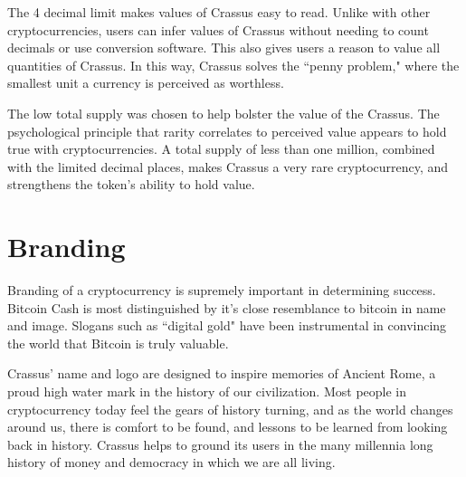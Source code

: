 \documentclass[12pt]{article}
\begin{document}
The 4 decimal limit makes values of Crassus easy to read.  Unlike with other cryptocurrencies, users can infer values of Crassus without needing to count decimals or use conversion software.  This also gives users a reason to value all quantities of Crassus.  In this way, Crassus solves the ``penny problem," where the smallest unit a currency is perceived as worthless.

The low total supply was chosen to help bolster the value of the Crassus.  The psychological principle that rarity correlates to perceived value appears to hold true with cryptocurrencies.  A total supply of less than one million, combined with the limited decimal places, makes Crassus a very rare cryptocurrency, and strengthens the token's ability to hold value.


\section{Branding}\label{Branding}
Branding of a cryptocurrency is supremely important in determining success.  Bitcoin Cash is most distinguished by it's close resemblance to bitcoin in name and image.  Slogans such as ``digital gold" have been instrumental in convincing the world that Bitcoin is truly valuable.

Crassus' name and logo are designed to inspire memories of Ancient Rome, a proud high water mark in the history of our civilization.  Most people in cryptocurrency today feel the gears of history turning, and as the world changes around us, there is comfort to be found, and lessons to be learned from looking back in history.  Crassus helps to ground its users in the many millennia long history of money and democracy in which we are all living.



\end{document}
